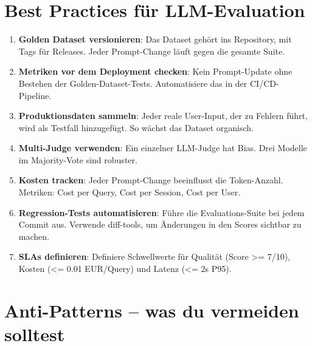\section{Best Practices für LLM-Evaluation}

\begin{enumerate}[leftmargin=*]
    \item \textbf{Golden Dataset versionieren}: Das Dataset gehört ins Repository, mit Tags für Releases. Jeder Prompt-Change läuft gegen die gesamte Suite.
    \item \textbf{Metriken vor dem Deployment checken}: Kein Prompt-Update ohne Bestehen der Golden-Dataset-Tests. Automatisiere das in der CI/CD-Pipeline.
    \item \textbf{Produktionsdaten sammeln}: Jeder reale User-Input, der zu Fehlern führt, wird als Testfall hinzugefügt. So wächst das Dataset organisch.
    \item \textbf{Multi-Judge verwenden}: Ein einzelner LLM-Judge hat Bias. Drei Modelle im Majority-Vote sind robuster.
    \item \textbf{Kosten tracken}: Jeder Prompt-Change beeinflusst die Token-Anzahl. Metriken: Cost per Query, Cost per Session, Cost per User.
    \item \textbf{Regression-Tests automatisieren}: Führe die Evaluations-Suite bei jedem Commit aus. Verwende diff-tools, um Änderungen in den Scores sichtbar zu machen.
    \item \textbf{SLAs definieren}: Definiere Schwellwerte für Qualität (Score >= 7/10), Kosten (<= 0.01 EUR/Query) und Latenz (<= 2s P95).
\end{enumerate}

\section{Anti-Patterns -- was du vermeiden solltest}

